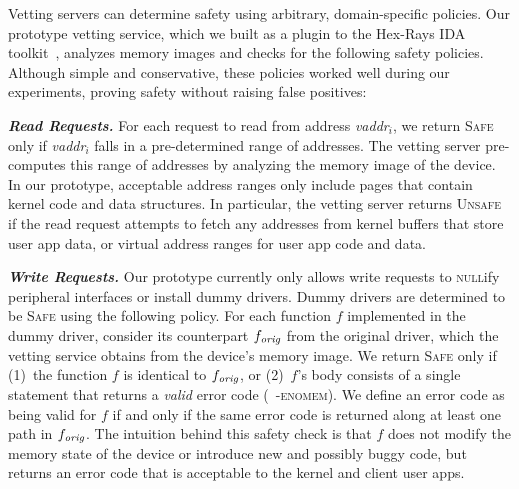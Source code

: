 Vetting servers can determine safety using arbitrary, domain-specific policies.
Our prototype vetting service, which we built as a plugin to the Hex-Rays IDA
toolkit~\cite{ida-pro}, analyzes memory images and checks for the following
safety policies. Although simple and conservative, these policies worked well
during our experiments, proving safety without raising false positives:
%
\begin{mybullet}
%
\item \textit{\textbf{Read Requests.}} For each request to read from address
\textit{vaddr}$_i$, we return \textsc{Safe} only if \textit{vaddr}$_i$ falls in
a pre-determined range of addresses. The vetting server pre-computes this range
of addresses by analyzing the memory image of the device. In our prototype,
acceptable address ranges only include pages that contain kernel code and data
structures. In particular, the vetting server returns \textsc{Unsafe} if the
read request attempts to fetch any addresses from kernel buffers that store
user app data, or virtual address ranges for user app code and data.
%
\item \textit{\textbf{Write Requests.}} Our prototype currently only allows
write requests to \textsc{null}ify peripheral interfaces or install dummy
drivers. Dummy drivers are determined to be \textsc{Safe} using the following
policy. For each function $f$ implemented in the dummy driver, consider its
counterpart $f_{\it orig}$ from the original driver, which the vetting service
obtains from the device's memory image. We return \textsc{Safe} only if
(1)~the function $f$ is identical to $f_{\it orig}$, or (2)~$f$'s body consists
of a single  statement that returns a \textit{valid} error code
(\eg~\textsc{-enomem}). We define an error code as being valid for $f$ if and
only if the same error code is returned along at least one path in $f_{\it
orig}$. The intuition behind this safety check is that $f$ does not modify the
memory state of the device or introduce new and possibly buggy code, but
returns an error code that is acceptable to the kernel and client user apps.
%
\end{mybullet}
%
